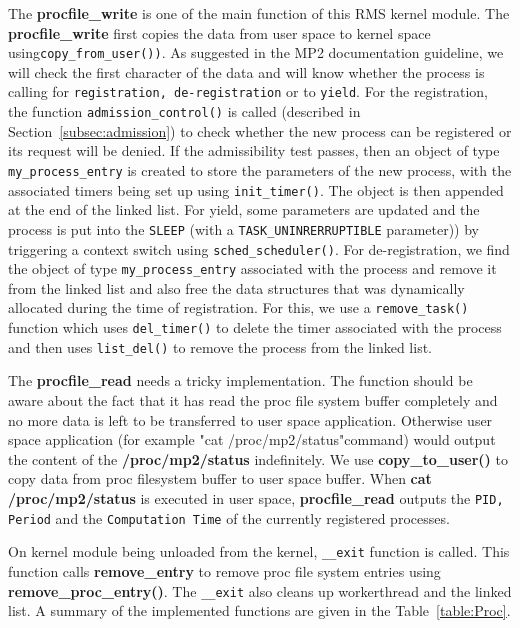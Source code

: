 The {\bf procfile\_write} is one of the main function of this RMS kernel module. The {\bf procfile\_write} first copies the data from user space to kernel space using{\tt copy\_from\_user())}. As suggested in the MP2 documentation guideline, we will check the first character of the data and will know whether the process is calling for {\tt registration, de-registration} or to {\tt yield}. For the registration, the function {\tt admission\_control()}
is called (described in Section~\ref{subsec:admission}) to check whether the new process can be registered or its request will be denied. If the admissibility test passes, then an object of type {\tt my\_process\_entry} is created to store the parameters of the new process, with the associated timers being set up using {\tt init\_timer()}. The object is then appended at the end of the linked list. For yield, some parameters
are updated and the process is put into the {\tt SLEEP} (with a {\tt TASK\_UNINRERRUPTIBLE} parameter)) by triggering a context switch using {\tt sched\_scheduler()}. For de-registration, we find the object of type {\tt my\_process\_entry} associated with the process and remove it from the linked list and also free the data structures that was dynamically allocated during the time of registration. For this, we use a {\tt remove\_task()} function which uses {\tt del\_timer()} to delete the timer associated with the process and then uses {\tt list\_del()} to remove the process from the linked list.

The {\bf procfile\_read} needs a tricky implementation. The function should be aware about the fact that it has read the proc file system buffer completely and no more data is left to be transferred to user space application. Otherwise user space application (for example "cat /proc/mp2/status"command) would output the content of the {\bf /proc/mp2/status} indefinitely. We use {\bf copy\_to\_user()} to copy data from proc filesystem buffer
to user space buffer. When {\bf cat /proc/mp2/status} is executed in user space, {\bf procfile\_read} outputs the {\tt PID, Period} and the {\tt Computation Time} of the currently registered processes. 

On kernel module being unloaded from the kernel, {\tt \_\_exit} function is called. This function calls {\bf remove\_entry} to remove proc file system entries using {\bf remove\_proc\_entry()}. The {\tt \_\_exit} also cleans up workerthread and the linked list. A summary of the implemented functions are given in the Table~\ref{table:Proc}.

